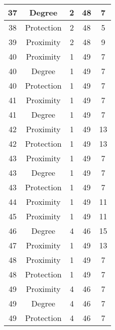 \documentclass[results.tex]{subfiles}
\begin{document}
\begin{center}
\begin{tabular}{| c || c | c | c | c |}
    \hline
    37 & Degree & 2 & 48 & 7 \\ 
    \hline
    38 & Protection & 2 & 48 & 5 \\ 
    \hline
    39 & Proximity & 2 & 48 & 9 \\ 
    \hline
    40 & Proximity & 1 & 49 & 7 \\ 
    \hline
    40 & Degree & 1 & 49 & 7 \\ 
    \hline
    40 & Protection & 1 & 49 & 7 \\ 
    \hline
    41 & Proximity & 1 & 49 & 7 \\ 
    \hline
    41 & Degree & 1 & 49 & 7 \\ 
    \hline
    42 & Proximity & 1 & 49 & 13 \\ 
    \hline
    42 & Protection & 1 & 49 & 13 \\ 
    \hline
    43 & Proximity & 1 & 49 & 7 \\ 
    \hline
    43 & Degree & 1 & 49 & 7 \\ 
    \hline
    43 & Protection & 1 & 49 & 7 \\ 
    \hline
    44 & Proximity & 1 & 49 & 11 \\ 
    \hline
    45 & Proximity & 1 & 49 & 11 \\ 
    \hline
    46 & Degree & 4 & 46 & 15 \\ 
    \hline
    47 & Proximity & 1 & 49 & 13 \\ 
    \hline
    48 & Proximity & 1 & 49 & 7 \\ 
    \hline
    48 & Protection & 1 & 49 & 7 \\ 
    \hline
    49 & Proximity & 4 & 46 & 7 \\ 
    \hline
    49 & Degree & 4 & 46 & 7 \\ 
    \hline
    49 & Protection & 4 & 46 & 7 \\ 
    \hline   \end{tabular}
\end{center}
\end{document}
